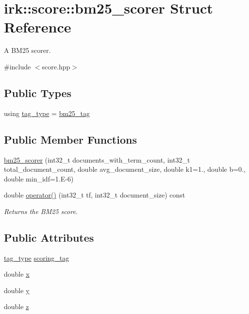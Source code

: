 \hypertarget{structirk_1_1score_1_1bm25__scorer}{}\section{irk\+:\+:score\+:\+:bm25\+\_\+scorer Struct Reference}
\label{structirk_1_1score_1_1bm25__scorer}


A B\+M25 scorer.  




{\ttfamily \#include $<$score.\+hpp$>$}

\subsection*{Public Types}
\begin{DoxyCompactItemize}
\item 
using \mbox{\hyperlink{structirk_1_1score_1_1bm25__scorer_ab99e02fc9ede9441ad9ee7a99077a720}{tag\+\_\+type}} = \mbox{\hyperlink{structirk_1_1score_1_1bm25__tag}{bm25\+\_\+tag}}
\end{DoxyCompactItemize}
\subsection*{Public Member Functions}
\begin{DoxyCompactItemize}
\item 
\mbox{\hyperlink{structirk_1_1score_1_1bm25__scorer_a71a44472ad2392f2d6bb936369e4df0f}{bm25\+\_\+scorer}} (int32\+\_\+t documents\+\_\+with\+\_\+term\+\_\+count, int32\+\_\+t total\+\_\+document\+\_\+count, double avg\+\_\+document\+\_\+size, double k1=1., double b=0., double min\+\_\+idf=1.\+E-\/6)
\item 
double \mbox{\hyperlink{structirk_1_1score_1_1bm25__scorer_a545df64dce2769d1fbbf74fb87f3bb84}{operator()}} (int32\+\_\+t tf, int32\+\_\+t document\+\_\+size) const
\begin{DoxyCompactList}\small\item\em Returns the B\+M25 score. \end{DoxyCompactList}\end{DoxyCompactItemize}
\subsection*{Public Attributes}
\begin{DoxyCompactItemize}
\item 
\mbox{\hyperlink{structirk_1_1score_1_1bm25__scorer_ab99e02fc9ede9441ad9ee7a99077a720}{tag\+\_\+type}} \mbox{\hyperlink{structirk_1_1score_1_1bm25__scorer_a2dd5b1c82f311ec4a02446de5f4dc2bd}{scoring\+\_\+tag}}
\item 
double \mbox{\hyperlink{structirk_1_1score_1_1bm25__scorer_ae9c6a79715c86d4fbd91651b36f0b2a3}{x}}
\item 
double \mbox{\hyperlink{structirk_1_1score_1_1bm25__scorer_a2a76be6700391b2b1309d03abd845975}{y}}
\item 
double \mbox{\hyperlink{structirk_1_1score_1_1bm25__scorer_abb7948471b6e6e960b49d184f717f683}{z}}
\end{DoxyCompactItemize}


